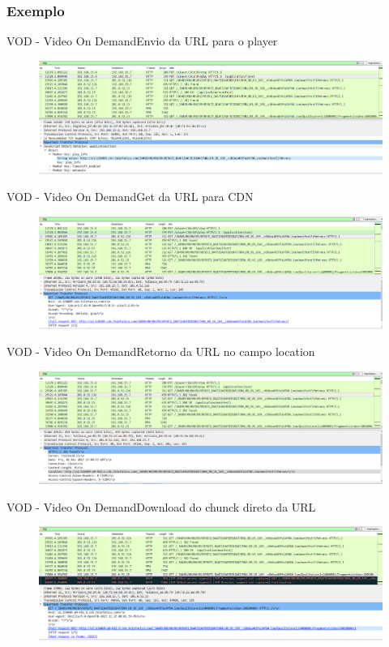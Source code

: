 \documentclass{beamer}
\begin{document}
\subsubsection{Exemplo}
\begin{frame}{VOD - Video On Demand}{Envio da URL para o player}
\begin{figure} 
\includegraphics[width=13cm]{Figuras/exemplo_vod_1.png} 
\label{figura:exemplo_vod_1}
\end{figure}
\end{frame}
\begin{frame}{VOD - Video On Demand}{Get da URL para CDN}
\begin{figure} 
\includegraphics[width=13cm]{Figuras/exemplo_vod_2.png} 
\label{figura:exemplo_vod_2}
\end{figure}
\end{frame}
\begin{frame}{VOD - Video On Demand}{Retorno da URL no campo location}
\begin{figure} 
\includegraphics[width=13cm]{Figuras/exemplo_vod_3.png} 
\label{figura:exemplo_vod_3}
\end{figure}
\end{frame}
\begin{frame}{VOD - Video On Demand}{Download do chunck direto da URL}
\begin{figure} 
\includegraphics[width=13cm]{Figuras/exemplo_vod_4.png} 
\label{figura:exemplo_vod_4}
\end{figure}
\end{frame}
\end{document}
